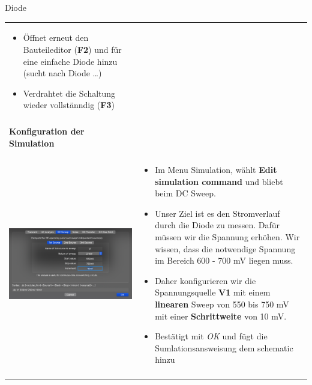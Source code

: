 \begin{frame}[t]{Diode}
\begin{spacing}{0.9}
\begin{tiny}
\begin{table}[h!]
\begin{tabular}{p{3cm} p{7cm}}
\begin{minipage}{.7\textwidth}
\begin{itemize}
          \item Öffnet erneut den Bauteileditor (\textbf{F2}) und für eine einfache Diode hinzu (sucht nach Diode \dots)
          \item Verdrahtet die Schaltung wieder vollstänndig (\textbf{F3})
        \end{itemize}
        \end{minipage} 
        \\
         & \\
         \hline
         \textbf{Konfiguration der Simulation} & \\
         \hline \\
         \begin{minipage}{.3\textwidth}
          \includegraphics[width=\linewidth]{pictures/simulationcmd_2.png}
        \end{minipage} 
        & 
        \begin{minipage}{.7\textwidth}
        \begin{itemize}
          \item Im Menu Simulation, wählt \textbf{Edit simulation command} und bliebt beim DC Sweep. 
          \item Unser Ziel ist es den Stromverlauf durch die Diode zu messen. Dafür müssen wir die Spannung erhöhen. 
          Wir wissen, dass die notwendige Spannung im Bereich 600 - 700 mV liegen muss. 
          \item Daher konfigurieren wir die Spannungsquelle \textbf{V1} mit einem \textbf{linearen} Sweep von 550 bis 750 mV mit einer \textbf{Schrittweite} von 10 mV.
          \item Bestätigt mit \textit{OK} und fügt die Sumlationsansweisung dem schematic hinzu
        \end{itemize}
        \end{minipage} 
        \\
         & \\
         \hline
      \end{tabular}
    
    \end{table}
    
    \end{tiny} \end{spacing}
    
     \end{frame}
    
